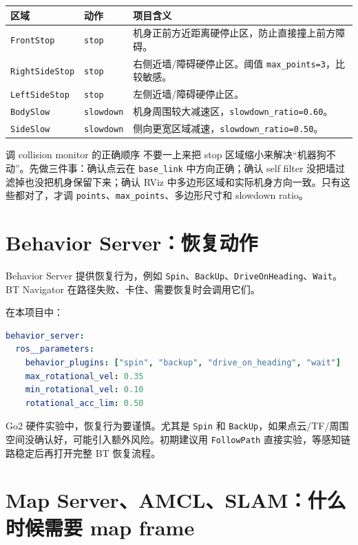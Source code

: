 \documentclass[UTF8,11pt,a4paper,openany]{ctexrep}
\newcommand{\code}[1]{\nolinkurl{#1}}
\newcommand{\param}[1]{\nolinkurl{#1}}
\newcommand{\actionname}[1]{\nolinkurl{#1}}
\begin{document}
\begin{longtable}{L{0.22\textwidth}L{0.20\textwidth}L{0.48\textwidth}}
\toprule
区域 & 动作 & 项目含义 \\
\midrule
\param{FrontStop} & \code{stop} & 机身正前方近距离硬停止区，防止直接撞上前方障碍。 \\
\param{RightSideStop} & \code{stop} & 右侧近墙/障碍硬停止区。阈值 \param{max_points=3}，比较敏感。 \\
\param{LeftSideStop} & \code{stop} & 左侧近墙/障碍硬停止区。 \\
\param{BodySlow} & \code{slowdown} & 机身周围较大减速区，\param{slowdown_ratio=0.60}。 \\
\param{SideSlow} & \code{slowdown} & 侧向更宽区域减速，\param{slowdown_ratio=0.50}。 \\
\bottomrule
\end{longtable}

\begin{warnbox}{调 collision monitor 的正确顺序}
不要一上来把 stop 区域缩小来解决“机器狗不动”。先做三件事：确认点云在 \code{base_link} 中方向正确；确认 self filter 没把墙过滤掉也没把机身保留下来；确认 RViz 中多边形区域和实际机身方向一致。只有这些都对了，才调 \param{points}、\param{max_points}、多边形尺寸和 slowdown ratio。
\end{warnbox}

\section{Behavior Server：恢复动作}

Behavior Server 提供恢复行为，例如 \code{Spin}、\code{BackUp}、\code{DriveOnHeading}、\code{Wait}。BT Navigator 在路径失败、卡住、需要恢复时会调用它们。

在本项目中：

\begin{lstlisting}[language=yaml]
behavior_server:
  ros__parameters:
    behavior_plugins: ["spin", "backup", "drive_on_heading", "wait"]
    max_rotational_vel: 0.35
    min_rotational_vel: 0.10
    rotational_acc_lim: 0.50
\end{lstlisting}

Go2 硬件实验中，恢复行为要谨慎。尤其是 \code{Spin} 和 \code{BackUp}，如果点云/TF/周围空间没确认好，可能引入额外风险。初期建议用 \actionname{FollowPath} 直接实验，等感知链路稳定后再打开完整 BT 恢复流程。

\section{Map Server、AMCL、SLAM：什么时候需要 map frame}
\end{document}
